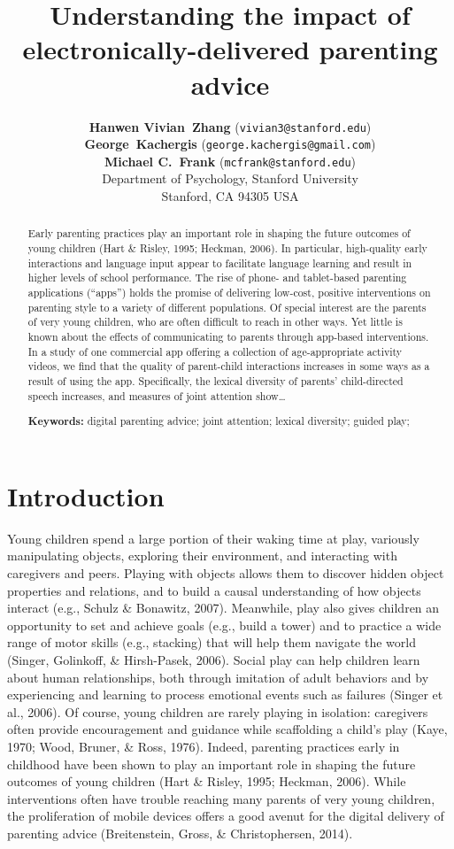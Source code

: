\documentclass[10pt, letterpaper]{article}
\title{Understanding the impact of electronically-delivered parenting advice}
\author{{\large\bf Hanwen Vivian~Zhang} (\texttt{vivian3@stanford.edu}) \\ {\large\bf George~Kachergis} (\texttt{george.kachergis@gmail.com}) \\ {\large\bf Michael C.~Frank} (\texttt{mcfrank@stanford.edu}) \\  Department of Psychology, Stanford University \\  Stanford, CA 94305 USA}
\begin{document}
\maketitle

\begin{abstract}
Early parenting practices play an important role in shaping the future
outcomes of young children (Hart \& Risley, 1995; Heckman, 2006). In
particular, high-quality early interactions and language input appear to
facilitate language learning and result in higher levels of school
performance. The rise of phone- and tablet-based parenting applications
(``apps'') holds the promise of delivering low-cost, positive
interventions on parenting style to a variety of different populations.
Of special interest are the parents of very young children, who are
often difficult to reach in other ways. Yet little is known about the
effects of communicating to parents through app-based interventions. In
a study of one commercial app offering a collection of age-appropriate
activity videos, we find that the quality of parent-child interactions
increases in some ways as a result of using the app. Specifically, the
lexical diversity of parents' child-directed speech increases, and
measures of joint attention show\ldots{}

\textbf{Keywords:}
digital parenting advice; joint attention; lexical diversity; guided
play;
\end{abstract}

\section{Introduction}\label{introduction}

Young children spend a large portion of their waking time at play,
variously manipulating objects, exploring their environment, and
interacting with caregivers and peers. Playing with objects allows them
to discover hidden object properties and relations, and to build a
causal understanding of how objects interact (e.g., Schulz \& Bonawitz,
2007). Meanwhile, play also gives children an opportunity to set and
achieve goals (e.g., build a tower) and to practice a wide range of
motor skills (e.g., stacking) that will help them navigate the world
(Singer, Golinkoff, \& Hirsh-Pasek, 2006). Social play can help children
learn about human relationships, both through imitation of adult
behaviors and by experiencing and learning to process emotional events
such as failures (Singer et al., 2006). Of course, young children are
rarely playing in isolation: caregivers often provide encouragement and
guidance while scaffolding a child's play (Kaye, 1970; Wood, Bruner, \&
Ross, 1976). Indeed, parenting practices early in childhood have been
shown to play an important role in shaping the future outcomes of young
children (Hart \& Risley, 1995; Heckman, 2006). While interventions
often have trouble reaching many parents of very young children, the
proliferation of mobile devices offers a good avenut for the digital
delivery of parenting advice (Breitenstein, Gross, \& Christophersen,
2014).
\end{document}

